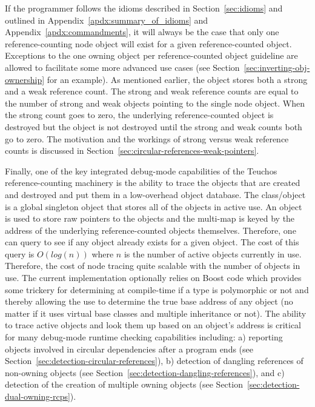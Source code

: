 \documentclass[pdf,ps2pdf,11pt]{SANDreport}
\begin{document}
If the programmer follows the idioms described in
Section~\ref{sec:idioms} and outlined in
Appendix~\ref{apdx:summary_of_idioms} and
Appendix~\ref{apdx:commandments}, it will always be the case that only
one reference-counting node object will exist for a given
reference-counted object.  Exceptions to the one owning
{} object per reference-counted object guideline are
allowed to facilitate some more advanced use cases (see
Section~\ref{sec:inverting-obj-ownership} for an example).  As
mentioned earlier, the {} object stores both a strong and
a weak reference count.  The strong and weak reference counts are
equal to the number of strong and weak {} objects pointing to
the single {} node object.  When the strong count goes to
zero, the underlying reference-counted object is destroyed but the
{} object is not destroyed until the strong and weak
counts both go to zero.  The motivation and the workings of strong
versus weak reference counts is discussed in
Section~\ref{sec:circular-references-weak-pointers}.

Finally, one of the key integrated debug-mode capabilities of the
Teuchos reference-counting machinery is the ability to trace the
{} objects that are created and destroyed and put them in
a low-overhead object database.  The {}
class/object is a global singleton object that stores all of the
{} objects in active use.  An {}
object is used to store raw pointers to the {} objects
and the multi-map is keyed by the {} address of the
underlying reference-counted objects themselves.  Therefore, one can
query to see if any {} object already exists for a given
object.  The cost of this query is $O(log(n))$ where $n$ is the number
of active {} objects currently in use.  Therefore, the
cost of node tracing quite scalable with the number of {}
objects in use.  The current implementation optionally relies on Boost
code which provides some trickery for determining at compile-time if a
type is polymorphic or not and thereby allowing the use
{} to determine the true base
address of any object (no matter if it uses virtual base classes and
multiple inheritance or not).  The ability to trace active
{} objects and look them up based on an object's address
is critical for many debug-mode runtime checking capabilities
including: a) reporting objects involved in circular dependencies
after a program ends (see
Section~\ref{sec:detection-circular-references}), b) detection of
dangling references of non-owning {} objects (see
Section~\ref{sec:detection-dangling-references}), and c) detection of
the creation of multiple owning {} objects (see
Section~\ref{sec:detection-dual-owning-rcps}).
\end{document}
